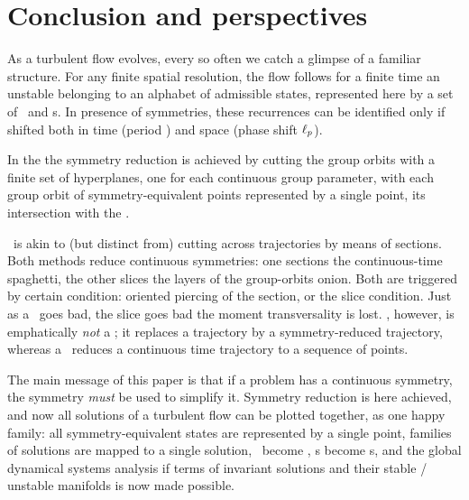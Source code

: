 
\section{Conclusion and perspectives}
\label{s:concl}


As a turbulent flow evolves, every so often we catch a glimpse of a
familiar structure. For any finite spatial resolution, the flow follows
for a finite time an unstable {\cohStr} belonging to an alphabet of
admissible states, represented here by a set of \reqva\ and \rpo s. In
presence of symmetries, these recurrences can be identified only if
shifted both in time (period ) and space (phase shift
$\ell_p$).

In the \mslices{} the
symmetry reduction is achieved by cutting the group orbits with a finite
set of hyperplanes, one for each continuous group parameter, with each
group orbit of symmetry-equivalent points represented by a single point,
its intersection with the \slice.

\Mslices\ is akin to (but distinct from) cutting across trajectories by
means of sections. Both methods reduce continuous symmetries: one
sections the continuous-time spaghetti, the other slices the layers of
the group-orbits onion. Both are triggered by certain condition: oriented
piercing of the section, or the slice condition. Just as a \PoincSec\
goes bad, the slice goes bad the moment transversality is lost.
\Slice, however, is emphatically \emph{not} a \PoincSec; it replaces a
trajectory by a symmetry-reduced trajectory, whereas a \PoincSec\ reduces
a continuous time trajectory to a sequence of points.

The main message of this paper is that if a problem has a continuous
symmetry, the symmetry \emph{must} be used to simplify it. Symmetry
reduction is here achieved, and now all solutions of a turbulent flow can
be plotted together, as one happy family: all symmetry-equivalent states
are represented by a single point, families of solutions are mapped to a
single solution, \reqva\ become \eqva, \rpo s become \po s, and the
global dynamical systems analysis if terms of invariant solutions and
their stable / unstable manifolds is now made possible.

